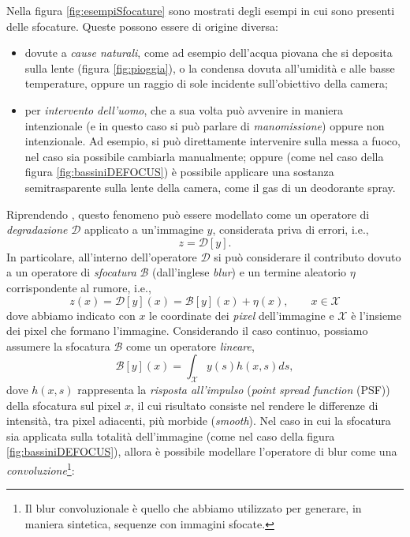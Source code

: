 \noindent Nella figura \ref{fig:esempiSfocature} sono mostrati degli esempi in cui sono presenti delle sfocature. 
Queste possono essere di origine diversa: 
\begin{itemize}
	\item dovute a \textit{cause naturali}, come ad esempio dell'acqua piovana che si deposita sulla lente (figura \ref{fig:pioggia}), o la condensa dovuta all'umidit\`a e alle basse temperature, oppure un raggio di sole incidente sull'obiettivo della camera;
	\item per \textit{intervento dell'uomo}, che a sua volta pu\`o avvenire in maniera intenzionale (e in questo caso si pu\`o parlare di \textit{manomissione}) oppure non intenzionale. Ad esempio, si pu\`o direttamente intervenire sulla messa a fuoco, nel caso sia possibile cambiarla manualmente; oppure (come nel caso della figura \ref{fig:bassiniDEFOCUS}) \`e possibile applicare una sostanza semitrasparente sulla lente della camera, come il gas di un deodorante spray.
\end{itemize}
Riprendendo \cite{alippi2010detecting}, questo fenomeno pu\`o essere modellato come un operatore di \textit{degradazione} $\mathcal{D}$ applicato a un'immagine $y$, considerata priva di errori, i.e.,
\begin{equation}
z=\mathcal{D}[y].
\end{equation}
In particolare, all'interno dell'operatore $\mathcal{D}$ si pu\`o considerare il contributo dovuto a un operatore di \textit{sfocatura} $\mathcal{B}$ (dall'inglese \textit{blur}) e un termine aleatorio $\eta$ corrispondente al rumore, i.e.,
\begin{equation}
\label{blur_single}
z(x)=\mathcal{D}[y](x) = \mathcal{B}[y](x) + \eta(x), \qquad x \in \mathcal{X}
\end{equation}
dove abbiamo indicato con $x$ le coordinate dei \textit{pixel} dell'immagine e $\mathcal{X}$ \`e l'insieme dei pixel che formano l'immagine. 
Considerando il caso continuo, possiamo assumere la sfocatura $\mathcal{B}$ come un operatore \textit{lineare},
\begin{equation}
\mathcal{B}[y](x) = \int_{\mathcal{X}}y(s)h(x,s)ds,
\end{equation}
dove $h(x,s)$ rappresenta la \textit{risposta all'impulso} (\textit{point spread function} (PSF)) della sfocatura sul pixel $x$, il cui risultato consiste nel rendere le differenze di intensit\`a, tra pixel adiacenti, pi\`u morbide (\textit{smooth}).
Nel caso in cui la sfocatura sia applicata sulla totalit\`a dell'immagine (come nel caso della figura \ref{fig:bassiniDEFOCUS}), allora \`e possibile modellare l'operatore di blur come una \textit{convoluzione}\footnote{Il blur convoluzionale \`e quello che abbiamo utilizzato per generare, in maniera sintetica, sequenze con immagini sfocate.}:
